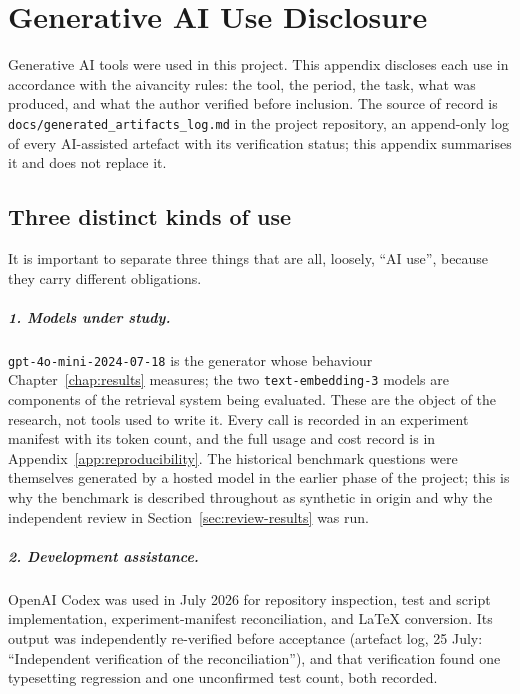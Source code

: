 \chapter{Generative AI Use Disclosure}
\label{app:ai-disclosure}

Generative AI tools were used in this project. This appendix discloses each use
in accordance with the aivancity rules: the tool, the period, the task, what was
produced, and what the author verified before inclusion. The source of record is
\texttt{docs/generated\_artifacts\_log.md} in the project repository, an
append-only log of every AI-assisted artefact with its verification status; this
appendix summarises it and does not replace it.


\section{Three distinct kinds of use}

It is important to separate three things that are all, loosely, ``AI use'',
because they carry different obligations.

\paragraph{1. Models under study.} \texttt{gpt-4o-mini-2024-07-18} is the
generator whose behaviour Chapter~\ref{chap:results} measures; the two
\texttt{text-embedding-3} models are components of the retrieval system being
evaluated. These are the object of the research, not tools used to write it.
Every call is recorded in an experiment manifest with its token count, and the
full usage and cost record is in Appendix~\ref{app:reproducibility}. The
historical benchmark questions were themselves generated by a hosted model in the
earlier phase of the project; this is why the benchmark is described throughout
as synthetic in origin and why the independent review in
Section~\ref{sec:review-results} was run.

\paragraph{2. Development assistance.} OpenAI Codex was used in July 2026 for
repository inspection, test and script implementation, experiment-manifest
reconciliation, and LaTeX conversion. Its output was independently re-verified
before acceptance (artefact log, 25 July: ``Independent verification of the
reconciliation''), and that verification found one typesetting regression and
one unconfirmed test count, both recorded.

